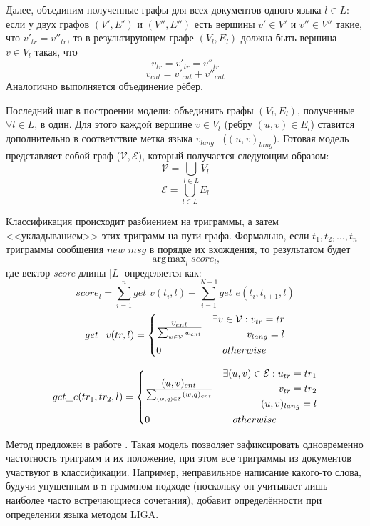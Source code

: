 \documentclass[a4paper, 14pt]{article}
\DeclareMathOperator*{\argmax}{\arg\!\max}
\begin{document}
		Далее, объединим полученные графы для всех документов одного языка $l \in L$: если у двух графов $(V', E')$ и $(V'', E'')$ есть вершины
		$v' \in V'$ и $v'' \in V''$ такие, что $v'_{tr} = v''_{tr}$, то в результирующем графе $(V_{l}, E_{l})$ должна быть вершина 
		$v \in V_{l}$ такая, что 
		$$v_{tr} = v'_{tr} = v''_{tr}$$ $$v_{cnt} = v'_{cnt} + v''_{cnt}$$
		Аналогично выполняется объединение рёбер.
		
		Последний шаг в построении модели: объединить графы $(V_{l}, E_{l})$, полученные $\forall l \in L$, в один. 
		Для этого каждой вершине $v \in V_{l}$
		(ребру $(u, v) \in E_{l}$) ставится дополнительно в соответствие метка языка $v_{lang}$ \ ($(u, v)_{lang}$). 
		Готовая модель представляет собой граф
		($\mathcal{V}, \mathcal{E}$), который получается следующим образом:
		$$ \mathcal{V} = \bigcup_{l \in L} V_{l}$$
		$$ \mathcal{E} = \bigcup_{l \in L} E_{l}$$
		
		Классификация происходит разбиением на триграммы, а затем <<укладыванием>> этих триграмм на пути графа. Формально, если
		$t_{1}, t_{2}, \ldots, t_{n}$ - триграммы сообщения $new\_msg$ в порядке их вхождения, то результатом будет
		$$ \argmax_{l} score_{l} ,$$
		где вектор \textit{score} длины $|L|$ определяется как:
		$$ score_{l} = \sum_{i=1}^{n} get\_v(t_{i}, l) + \sum_{i=1}^{N-1} get\_e(t_{i}, t_{i+1}, l)$$
		\[
 		get\_v(tr, l) =
 		  \begin{dcases}
  		   v_{cnt} \over \sum_{w \in \mathcal{V}} w_{cnt} & 
  		   \begin{split} 
					 \exists v \in \mathcal{V}: v_{tr}=tr \\ v_{lang}=l	
  		   	\end{split} \\
  		   0 & \quad otherwise
  		 \end{dcases}
		\]		
		
		\[
 		get\_e(tr_1, tr_2, l) =
 		  \begin{dcases}
  		   (u, v)_{cnt} \over \sum_{(w, q) \in \mathcal{E}} (w, q)_{cnt} & 
  		    \begin{split} 
					 \exists (u, v) \in \mathcal{E}:  u_{tr}=tr_1 \\ v_{tr}=tr_2 \\ (u, v)_{lang}=l
  		   	\end{split} \\
  		   0 & \quad otherwise
  		 \end{dcases}
		\]	
		
		Метод предложен в работе \cite{liga}. Такая модель позволяет зафиксировать одновременно частотность триграмм и их положение, при этом все триграммы
		из документов участвуют в классификации. Например, неправильное написание какого-то слова, будучи упущенным в n-граммном подходе (поскольку он
		учитывает лишь наиболее часто встречающиеся сочетания), добавит определённости при определении языка методом LIGA.		
		
\end{document}
